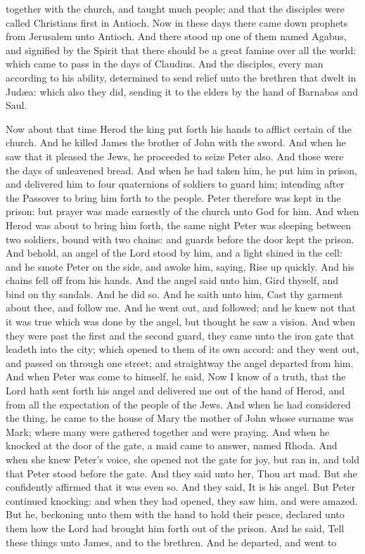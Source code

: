 together with the church, and taught much people; and that the disciples were called Christians first in Antioch.  Now in these days there came down prophets from Jerusalem unto Antioch. And there stood up one of them named Agabus, and signified by the Spirit that there should be a great famine over all the world: which came to pass in the days of Claudius. And the disciples, every man according to his ability, determined to send relief unto the brethren that dwelt in Judæa: which also they did, sending it to the elders by the hand of Barnabas and Saul. 

Now about that time Herod the king put forth his hands to afflict certain of the church. And he killed James the brother of John with the sword. And when he saw that it pleased the Jews, he proceeded to seize Peter also. And those were the days of unleavened bread. And when he had taken him, he put him in prison, and delivered him to four quaternions of soldiers to guard him; intending after the Passover to bring him forth to the people. Peter therefore was kept in the prison: but prayer was made earnestly of the church unto God for him. And when Herod was about to bring him forth, the same night Peter was sleeping between two soldiers, bound with two chains: and guards before the door kept the prison. And behold, an angel of the Lord stood by him, and a light shined in the cell: and he smote Peter on the side, and awoke him, saying, Rise up quickly. And his chains fell off from his hands. And the angel said unto him, Gird thyself, and bind on thy sandals. And he did so. And he saith unto him, Cast thy garment about thee, and follow me. And he went out, and followed; and he knew not that it was true which was done by the angel, but thought he saw a vision. And when they were past the first and the second guard, they came unto the iron gate that leadeth into the city; which opened to them of its own accord: and they went out, and passed on through one street; and straightway the angel departed from him. And when Peter was come to himself, he said, Now I know of a truth, that the Lord hath sent forth his angel and delivered me out of the hand of Herod, and from all the expectation of the people of the Jews. And when he had considered the thing, he came to the house of Mary the mother of John whose surname was Mark; where many were gathered together and were praying. And when he knocked at the door of the gate, a maid came to answer, named Rhoda. And when she knew Peter’s voice, she opened not the gate for joy, but ran in, and told that Peter stood before the gate. And they said unto her, Thou art mad. But she confidently affirmed that it was even so. And they said, It is his angel. But Peter continued knocking: and when they had opened, they saw him, and were amazed. But he, beckoning unto them with the hand to hold their peace, declared unto them how the Lord had brought him forth out of the prison. And he said, Tell these things unto James, and to the brethren. And he departed, and went to 